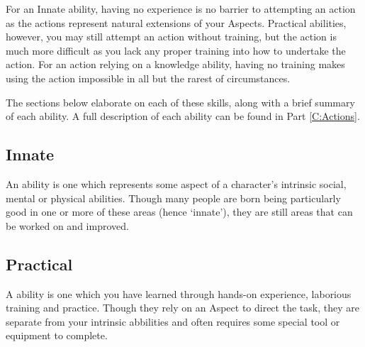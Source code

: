 For an Innate ability, having no experience is no barrier to attempting an action as the actions represent natural extensions of your Aspects. Practical abilities, however, you may still attempt an action without training, but the action is much more difficult as you lack any proper training into how to undertake the action. For an action relying on a knowledge ability, having no training makes using the action impossible in all but the rarest of circumstances.

The sections below elaborate on each of these skills, along with a brief summary of each ability. A full description of each ability can be found in Part \ref{C:Actions}.



\subsection{Innate} 
\normalsize
An  ability is one which represents some aspect of a character's intrinsic social, mental or physical abilities. Though many people are born being particularly good in one or more of these areas (hence `innate'), they are still areas that can be worked on and improved. 


\abilityTable
{
}


\subsection{Practical}

A  ability is one which you have learned through hands-on experience, laborious training and practice. Though they rely on an Aspect to direct the task, they are separate from your intrinsic abbilities and often requires some special tool or equipment to complete. 

